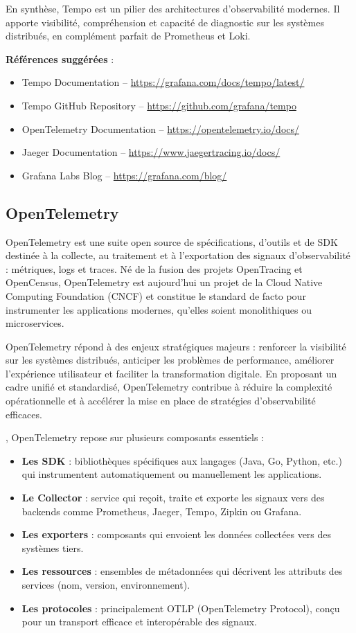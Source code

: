 En synthèse, Tempo est un pilier des architectures d’observabilité modernes. Il apporte visibilité, compréhension et capacité de diagnostic sur les systèmes distribués, en complément parfait de Prometheus et Loki.

\textbf{Références suggérées} :
\begin{itemize}
	\item Tempo Documentation – \url{https://grafana.com/docs/tempo/latest/}
	\item Tempo GitHub Repository – \url{https://github.com/grafana/tempo}
	\item OpenTelemetry Documentation – \url{https://opentelemetry.io/docs/}
	\item Jaeger Documentation – \url{https://www.jaegertracing.io/docs/}
	\item Grafana Labs Blog – \url{https://grafana.com/blog/}
\end{itemize}

\subsection{OpenTelemetry}

OpenTelemetry est une suite open source de spécifications, d’outils et de SDK destinée à la collecte, au traitement et à l’exportation des signaux d’observabilité  : métriques, logs et traces. Né de la fusion des projets OpenTracing et OpenCensus, OpenTelemetry est aujourd’hui un projet de la Cloud Native Computing Foundation (CNCF) et constitue le standard de facto pour instrumenter les applications modernes, qu’elles soient monolithiques ou microservices.

OpenTelemetry répond à des enjeux stratégiques majeurs  : renforcer la visibilité sur les systèmes distribués, anticiper les problèmes de performance, améliorer l’expérience utilisateur et faciliter la transformation digitale. En proposant un cadre unifié et standardisé, OpenTelemetry contribue à réduire la complexité opérationnelle et à accélérer la mise en place de stratégies d’observabilité efficaces.

, OpenTelemetry repose sur plusieurs composants essentiels  :
\begin{itemize}
	\item \textbf{Les SDK}  : bibliothèques spécifiques aux langages (Java, Go, Python, etc.) qui instrumentent automatiquement ou manuellement les applications.
	\item \textbf{Le Collector}  : service qui reçoit, traite et exporte les signaux vers des backends comme Prometheus, Jaeger, Tempo, Zipkin ou Grafana.
	\item \textbf{Les exporters}  : composants qui envoient les données collectées vers des systèmes tiers.
	\item \textbf{Les ressources}  : ensembles de métadonnées qui décrivent les attributs des services (nom, version, environnement).
	\item \textbf{Les protocoles}  : principalement OTLP (OpenTelemetry Protocol), conçu pour un transport efficace et interopérable des signaux.
\end{itemize}

